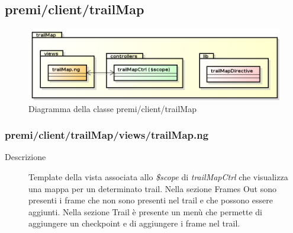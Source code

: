 \clearpage
\subsection{premi/client/trailMap}
\begin{figure}[H]
\begin{center}
\includegraphics[scale=0.70]{img/diapkg/trailMap.png}
\caption{Diagramma della classe premi/client/trailMap}
\end{center}
\end{figure}

\subsubsection{premi/client/trailMap/views/trailMap.ng}

\begin{description}
\item[Descrizione] \hfill
	Template della vista associata allo \textit{\$scope} di \textit{trailMapCtrl} che visualizza una mappa per un determinato trail. Nella sezione Frames Out sono presenti i frame che non sono presenti nel trail e che possono essere aggiunti. Nella sezione Trail è presente un menù che permette di aggiungere un checkpoint e di aggiungere i frame nel trail. 
\end{description}

